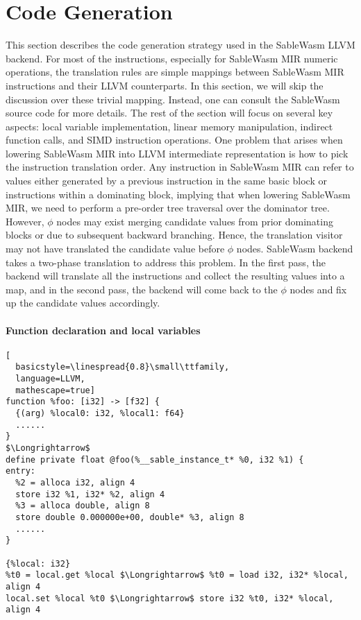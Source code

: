 \section{Code Generation}

This section describes the code generation strategy used in the SableWasm LLVM
backend. For most of the instructions, especially for SableWasm MIR numeric
operations, the translation rules are simple mappings between SableWasm MIR
instructions and their LLVM counterparts. In this section, we will skip the
discussion over these trivial mapping. Instead, one can consult the SableWasm
source code for more details. The rest of the section will focus on several
key aspects: local variable implementation, linear memory manipulation,
indirect function calls, and SIMD instruction operations. One problem that
arises when lowering SableWasm MIR into LLVM intermediate representation is
how to pick the instruction translation order. Any instruction in SableWasm MIR
can refer to values either generated by a previous instruction in the same basic
block or instructions within a dominating block, implying that when lowering
SableWasm MIR, we need to perform a pre-order tree traversal over the dominator
tree. However, $\phi$ nodes may exist merging candidate values from prior
dominating blocks or due to subsequent backward branching.
Hence, the translation visitor may not have translated the candidate value
before $\phi$ nodes. SableWasm backend takes a two-phase translation to address
this problem. In the first pass, the backend will translate all the instructions
and collect the resulting values into a map, and in the second pass, the backend
will come back to the $\phi$ nodes and fix up the candidate values accordingly.

\paragraph{Function declaration and local variables} \quad
\begin{lstlisting}[
  basicstyle=\linespread{0.8}\small\ttfamily, 
  language=LLVM, 
  mathescape=true]
function %foo: [i32] -> [f32] {
  {(arg) %local0: i32, %local1: f64} 
  ......
}
$\Longrightarrow$
define private float @foo(%__sable_instance_t* %0, i32 %1) {
entry:
  %2 = alloca i32, align 4
  store i32 %1, i32* %2, align 4
  %3 = alloca double, align 8
  store double 0.000000e+00, double* %3, align 8
  ......
}

{%local: i32} 
%t0 = local.get %local $\Longrightarrow$ %t0 = load i32, i32* %local, align 4
local.set %local %t0 $\Longrightarrow$ store i32 %t0, i32* %local, align 4
\end{lstlisting}

